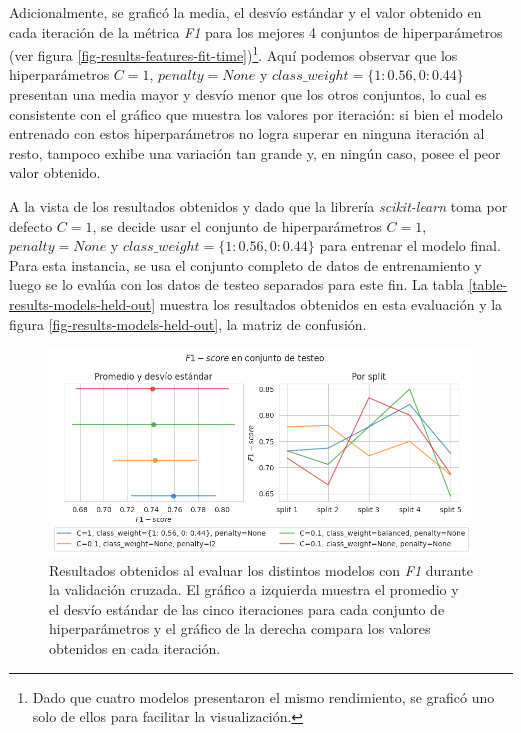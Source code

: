 Adicionalmente, se grafic\'o la media, el desv\'io est\'andar y el valor
obtenido en cada iteraci\'on de la m\'etrica \textit{F1}
para los mejores 4 conjuntos de hiperpar\'ametros
(ver figura \ref{fig-results-features-fit-time})\footnote{Dado
que cuatro modelos presentaron el mismo rendimiento, se grafic\'o uno solo
de ellos para facilitar la visualizaci\'on.}.
Aqu\'i podemos observar que los hiperpar\'ametros $C=1$, $penalty=None$
y $class\_weight=\lbrace1:0.56,0:0.44\rbrace$
presentan una media mayor y desv\'io menor que los otros
conjuntos, lo cual es consistente con el gr\'afico que muestra
los valores por iteraci\'on: si bien el modelo entrenado con estos hiperpar\'ametros
no logra superar en ninguna iteraci\'on al resto, tampoco exhibe
una variaci\'on tan grande y, en ning\'un caso, posee el peor valor
obtenido.
\par
A la vista de los resultados obtenidos y dado que la librería \textit{scikit-learn} toma
por defecto $C=1$, se decide usar el conjunto de hiperparámetros
$C=1$, $penalty=None$ y $class\_weight=\lbrace1:0.56,0:0.44\rbrace$
para entrenar el modelo final.
Para esta instancia, se usa el conjunto completo de datos de entrenamiento y luego
se lo eval\'ua con los datos de testeo separados para este fin. La tabla
\ref{table-results-models-held-out} muestra los resultados obtenidos en
esta evaluaci\'on y la figura \ref{fig-results-models-held-out}, la matriz
de confusi\'on.

\begin{figure}[h!]
    \centering
    \includegraphics[scale=0.5]{./images/graphs/f1_by_split.png}
    \caption{Resultados obtenidos al evaluar los distintos modelos con
    \textit{F1} durante la validaci\'on cruzada. El gr\'afico a izquierda muestra el
    promedio y el desv\'io est\'andar de las cinco iteraciones para cada conjunto
    de hiperpar\'ametros y el gr\'afico de la derecha compara los valores obtenidos en
    cada iteraci\'on.}
    \label{fig-results-models-f1}
\end{figure}

